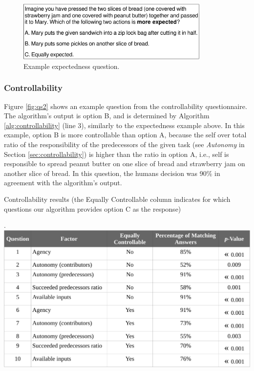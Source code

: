 \documentclass[12pt]{report}
\begin{document}
\begin{figure}[b]
  \centering
  \includegraphics[width=0.85\textwidth]{figure/question-sample-croped.pdf}
  \caption{{Example expectedness question.}}
  \label{fig:qs1}
\end{figure}

\subsubsection{Controllability}
\label{sec:controllability-crowdsourcing}
Figure \ref{fig:qs2} shows an example question from the controllability
questionnaire. The algorithm's output is option B, and is determined by
Algorithm \ref{alg:controllability} (line 3), similarly to the expectedness
example above. In this example, option B is more controllable than option A,
because the self over total ratio of the responsibility of the predecessors of
the given task (see \textit{Autonomy} in Section \ref{sec:controllability}) is
higher than the ratio in option A, i.e., self is responsible to spread peanut
butter on one slice of bread and strawberry jam on another slice of bread. In
this question, the humans decision was 90\% in agreement with the algorithm's
output.

\begin{table}[t]
  \centering
  \caption{Controllability results (the Equally Controllable column
  indicates for which questions our algorithm provides option C as the response)}.
  \label{fig:controllability_result}
  \vspace*{-3mm}
  \includegraphics[width=1\textwidth]{figure/controllability_result_croped.pdf}
\end{table}
\end{document}
